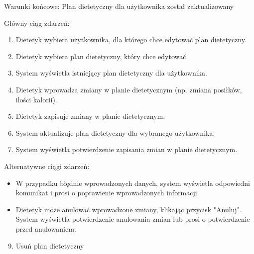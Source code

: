 \documentclass[
]{article}
\providecommand{\tightlist}{%
  \setlength{\itemsep}{0pt}\setlength{\parskip}{0pt}}
\begin{document}
{Warunki końcowe: Plan dietetyczny dla użytkownika został
zaktualizowany}

{Główny ciąg zdarzeń:}

\begin{enumerate}
\tightlist
\item
  {Dietetyk wybiera użytkownika, dla którego chce edytować plan
  dietetyczny.}
\item
  {Dietetyk wybiera plan dietetyczny, który chce edytować.}
\item
  {System wyświetla istniejący plan dietetyczny dla użytkownika.}
\item
  {Dietetyk wprowadza zmiany w planie dietetycznym (np. zmiana posiłków,
  ilości kalorii).}
\item
  {Dietetyk zapisuje zmiany w planie dietetycznym.}
\item
  {System aktualizuje plan dietetyczny dla wybranego użytkownika.}
\item
  {System wyświetla potwierdzenie zapisania zmian w planie
  dietetycznym.}
\end{enumerate}

{Alternatywne ciągi zdarzeń:}

\begin{itemize}
\tightlist
\item
  {W przypadku błędnie wprowadzonych danych, system wyświetla odpowiedni
  komunikat i prosi o poprawienie wprowadzonych informacji.}
\item
  {Dietetyk może anulować wprowadzone zmiany, klikając przycisk
  "Anuluj". System wyświetla potwierdzenie anulowania zmian lub prosi o
  potwierdzenie przed anulowaniem.}
\end{itemize}

{}

\begin{enumerate}
\setcounter{enumi}{8}
\tightlist
\item
  {Usuń plan dietetyczny}
\end{enumerate}
\end{document}
